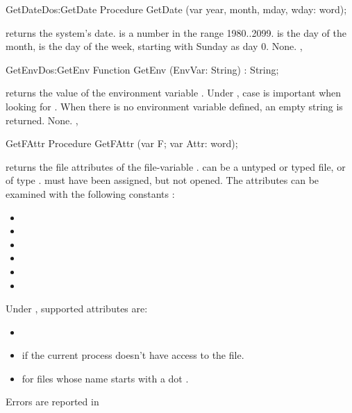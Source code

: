 \begin{procedurel}{GetDate}{Dos:GetDate}
\Declaration
Procedure GetDate (var year, month, mday, wday: word);
\Description

 returns the system's date.  is a number in the range
1980..2099. is the day of the month,
 is the day of the week, starting with Sunday as day 0.
\Errors
None.
\SeeAlso
{},
\end{procedurel}
\latex{}
\html{}
\begin{functionl}{GetEnv}{Dos:GetEnv}
\Declaration
Function GetEnv (EnvVar: String) : String;

\Description

 returns the value of the environment variable .
Under \linux, case is important when looking for .
When there is no environment variable  defined, an empty
string is returned.
\Errors
None.
\SeeAlso
{}, 
\end{functionl}
\latex{}
\html{}
\begin{procedure}{GetFAttr}
\Declaration
Procedure GetFAttr (var F; var Attr: word);

\Description

 returns the file attributes of the file-variable .
  can be a untyped or typed file, or of type .  must
have been assigned, but not opened. The attributes can be examined with the
following constants :
\begin{itemize}
\item {}
\item {}
\item {}
\item {}
\item {}
\item {}
\end{itemize}
Under \linux, supported attributes are:
\begin{itemize}
\item {}
\item {} if the current process doesn't have access to the file.
\item {} for files whose name starts with a dot .
\end{itemize}

\Errors
Errors are reported in 
\SeeAlso
{}
\end{procedure}
